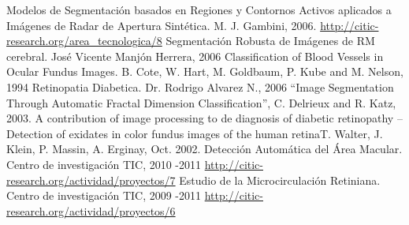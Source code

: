 \documentclass[14pt]{article}
\begin{document}
\newpage
\begin{thebibliography}{1}
 	  Modelos de Segmentación basados en Regiones y Contornos Activos aplicados a Imágenes de Radar de Apertura Sintética. M. J. Gambini, 2006.
 	  \url{ http://citic-research.org/area_tecnologica/8}
 	 Segmentación Robusta de Imágenes de RM cerebral. José Vicente Manjón Herrera, 2006
	 Classification of Blood Vessels in Ocular Fundus Images. B. Cote, W. Hart, M. Goldbaum, P. Kube and M. Nelson, 1994
	Retinopatia Diabetica. Dr. Rodrigo Alvarez N., 2006
	  “Image Segmentation Through Automatic Fractal Dimension Classification”, C. Delrieux and R. Katz, 2003.
	 A contribution of image processing to de diagnosis of diabetic retinopathy – Detection of exidates in color fundus images of the human retinaT. Walter, J. Klein, P. Massin, A. Erginay, Oct. 2002.
	 Detección Automática del Área Macular. Centro de investigación TIC, 2010 -2011 \url{ http://citic-research.org/actividad/proyectos/7}
	Estudio de la Microcirculación Retiniana. Centro de investigación TIC, 2009 -2011 \url{ http://citic-research.org/actividad/proyectos/6}

\end{thebibliography}
\end{document}
